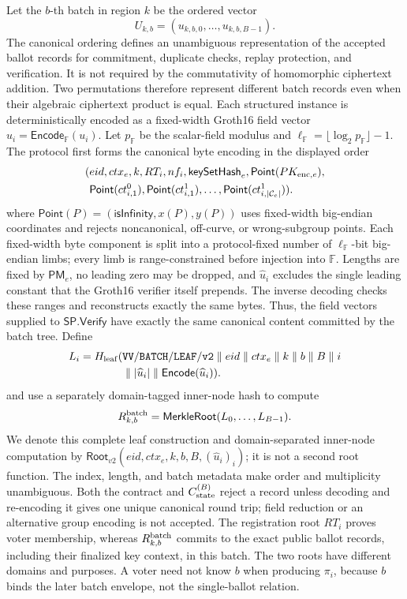 \documentclass[pdflatex,sn-mathphys-num]{sn-jnl}%
\theoremstyle{thmstyleone}%
\theoremstyle{thmstyletwo}%
\theoremstyle{thmstylethree}%
\begin{document}
Let the $b$-th batch in region $k$ be the ordered vector
\[
 U_{k,b}=(u_{k,b,0},\ldots,u_{k,b,B-1}).
\]
The canonical ordering defines an unambiguous representation of the accepted
ballot records for commitment, duplicate checks, replay protection, and
verification.  It is not required by the commutativity of homomorphic
ciphertext addition.  Two permutations therefore represent different batch
records even when their algebraic ciphertext product is equal.
Each structured instance is deterministically encoded as a fixed-width Groth16 field vector $\widehat u_i=\mathsf{Encode}_{\mathbb F}(u_i)$. Let $p_{\mathbb F}$ be the scalar-field modulus and $\ell_{\mathbb F}=\lfloor\log_2p_{\mathbb F}\rfloor-1$. The protocol first forms the canonical byte encoding in the displayed order
\[
\begin{aligned}
 (&eid,ctx_e,k,RT_i,nf_i,\mathsf{keySetHash}_e,
  \mathsf{Point}(PK_{{\rm enc},e}),\\
 &\mathsf{Point}(ct_{i,1}^0),\mathsf{Point}(ct_{i,1}^1),\ldots,
  \mathsf{Point}(ct_{i,|\mathcal C_e|}^1)).
\end{aligned}
\]
where $\mathsf{Point}(P)=(\mathsf{isInfinity},x(P),y(P))$ uses fixed-width big-endian coordinates and rejects noncanonical, off-curve, or wrong-subgroup points. Each fixed-width byte component is split into a protocol-fixed number of $\ell_{\mathbb F}$-bit big-endian limbs; every limb is range-constrained before injection into $\mathbb F$. Lengths are fixed by $\mathsf{PM}_e$, no leading zero may be dropped, and $\widehat u_i$ excludes the single leading constant that the Groth16 verifier itself prepends. The inverse decoding checks these ranges and reconstructs exactly the same bytes. Thus, the field vectors supplied to $\mathsf{SP.Verify}$ have exactly the same canonical content committed by the batch tree. Define
\[
\begin{aligned}
 L_i=H_{\rm leaf}(&\mathtt{VV/BATCH/LEAF/v2}\parallel eid\parallel ctx_e\parallel k
 \parallel b\parallel B\parallel i\\
 &\parallel |\widehat u_i|\parallel\mathsf{Encode}(\widehat u_i)).
\end{aligned}
\]
and use a separately domain-tagged inner-node hash to compute
\[
 R^{\rm batch}_{k,b}=\mathsf{MerkleRoot}(L_0,\ldots,L_{B-1}).
\]
We denote this complete leaf construction and domain-separated inner-node
computation by
$\mathsf{Root}_{v2}(eid,ctx_e,k,b,B,(\widehat u_i)_i)$; it is not a second
root function.
The index, length, and batch metadata make order and multiplicity unambiguous. Both the contract and $C_{\rm state}^{(B)}$ reject a record unless decoding and re-encoding it gives one unique canonical round trip; field reduction or an alternative group encoding is not accepted. The registration root $RT_i$ proves voter membership, whereas $R^{\rm batch}_{k,b}$ commits to the exact public ballot records, including their finalized key context, in this batch. The two roots have different domains and purposes. A voter need not know $b$ when producing $\pi_i$, because $b$ binds the later batch envelope, not the single-ballot relation.
\end{document}
